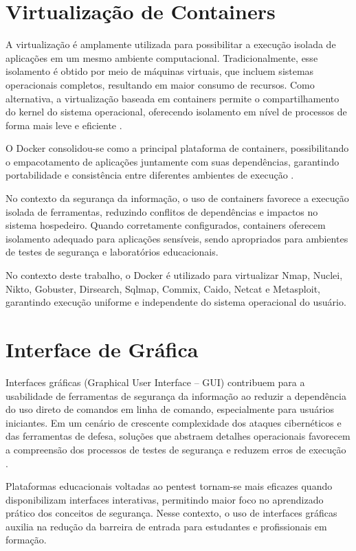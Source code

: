 \section{Virtualização de Containers}
    A virtualização é amplamente utilizada para possibilitar a execução isolada de aplicações em um mesmo
    ambiente computacional. Tradicionalmente, esse isolamento é obtido por meio de máquinas virtuais, 
    que incluem sistemas operacionais completos, resultando em maior consumo de recursos. Como alternativa,
    a virtualização baseada em containers permite o compartilhamento do kernel do sistema operacional, 
    oferecendo isolamento em nível de processos de forma mais leve e eficiente \citep{pahl2015containerization}.

    O Docker consolidou-se como a principal plataforma de containers, possibilitando o empacotamento 
    de aplicações juntamente com suas dependências, garantindo portabilidade e consistência entre diferentes
    ambientes de execução \citep{merkel2014docker}.

    No contexto da segurança da informação, o uso de containers favorece a execução isolada de ferramentas,
    reduzindo conflitos de dependências e impactos no sistema hospedeiro. Quando corretamente configurados,
    containers oferecem isolamento adequado para aplicações sensíveis, sendo apropriados para ambientes de testes
    de segurança e laboratórios educacionais\citep{combe2016docker}.

    No contexto deste trabalho, o Docker é utilizado para virtualizar Nmap, Nuclei, Nikto, Gobuster, Dirsearch,
    Sqlmap, Commix, Caido, Netcat e Metasploit, garantindo execução uniforme e independente do sistema operacional
    do usuário.

\section{Interface de Gráfica}

    Interfaces gráficas (Graphical User Interface – GUI) contribuem para a usabilidade de ferramentas de segurança
    da informação ao reduzir a dependência do uso direto de comandos em linha de comando, especialmente para usuários
    iniciantes. Em um cenário de crescente complexidade dos ataques cibernéticos e das ferramentas de defesa, 
    soluções que abstraem detalhes operacionais favorecem a compreensão dos processos de testes de segurança e 
    reduzem erros de execução \citep{ahmad2023zero}.

    Plataformas educacionais voltadas ao pentest tornam-se mais eficazes quando disponibilizam interfaces interativas,
    permitindo maior foco no aprendizado prático dos conceitos de segurança. Nesse contexto, o uso de interfaces gráficas
    auxilia na redução da barreira de entrada para estudantes e profissionais em formação\citep{alaryani2024penthack}.

